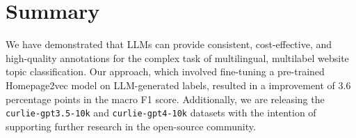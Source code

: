 \section{Summary}\label{sec:summary}

We have demonstrated that LLMs can provide consistent, cost-effective, and high-quality annotations for the complex task of multilingual, multilabel website topic classification. Our approach, which involved fine-tuning a pre-trained Homepage2vec model on LLM-generated labels, resulted in a improvement of 3.6 percentage points in the macro F1 score. Additionally, we are releasing the \texttt{curlie-gpt3.5-10k} and \texttt{curlie-gpt4-10k} datasets with the intention of supporting further research in the open-source community.